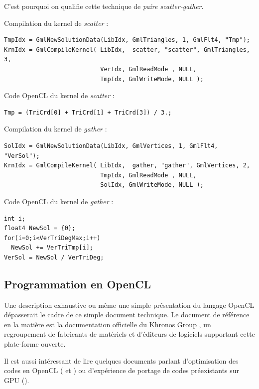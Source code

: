 \documentclass[a4paper,12pt]{article}
\begin{document}
C'est pourquoi on qualifie cette technique de \emph{paire scatter-gather}.

Compilation du kernel de \emph{scatter} :
\begin{tt}
\begin{verbatim}
TmpIdx = GmlNewSolutionData(LibIdx, GmlTriangles, 1, GmlFlt4, "Tmp");
KrnIdx = GmlCompileKernel( LibIdx,  scatter, "scatter", GmlTriangles, 3,
                           VerIdx, GmlReadMode , NULL,
                           TmpIdx, GmlWriteMode, NULL );
\end{verbatim}
\end{tt}
\normalfont

Code OpenCL du kernel de \emph{scatter} :
\begin{tt}
\begin{verbatim}
Tmp = (TriCrd[0] + TriCrd[1] + TriCrd[3]) / 3.;
\end{verbatim}
\end{tt}
\normalfont

Compilation du kernel de \emph{gather} :
\begin{tt}
\begin{verbatim}
SolIdx = GmlNewSolutionData(LibIdx, GmlVertices, 1, GmlFlt4, "VerSol");
KrnIdx = GmlCompileKernel( LibIdx,  gather, "gather", GmlVertices, 2,
                           TmpIdx, GmlReadMode , NULL,
                           SolIdx, GmlWriteMode, NULL );
\end{verbatim}
\end{tt}
\normalfont

Code OpenCL du kernel de \emph{gather} :
\begin{tt}
\begin{verbatim}
int i;
float4 NewSol = {0};
for(i=0;i<VerTriDegMax;i++)
  NewSol += VerTriTmp[i];
VerSol = NewSol / VerTriDeg;
\end{verbatim}
\end{tt}
\normalfont


\subsection{Programmation en OpenCL}
Une description exhaustive ou même une simple présentation du langage OpenCL dépasserait le cadre de ce simple document technique. Le document de référence en la matière est la documentation officielle du Khronos Group \cite{khronos}, un regroupement de fabricants de matériels et d'éditeurs de logiciels supportant cette plate-forme ouverte.

Il est aussi intéressant de lire quelques documents parlant d'optimisation des codes en OpenCL (\cite{nvidia} et \cite{apple}) ou d'expérience de portage de codes préexistants sur GPU (\cite{lohner}).
\end{document}
